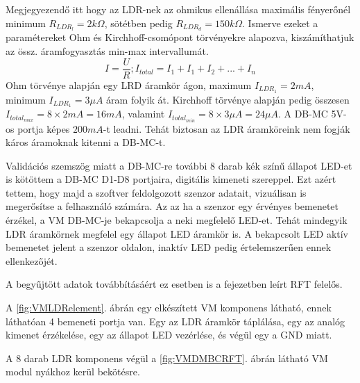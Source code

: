 \documentclass[a4paper,12pt]{article}
\begin{document}
Megjegyezendő itt hogy az LDR-nek az ohmikus ellenállása maximális fényerőnél minimum $R_{LDR_l} = 2 k\Omega$, sötétben pedig $R_{LDR_d} = 150 k\Omega$.
Ismerve ezeket a paramétereket Ohm és Kirchhoff-csomópont törvényekre alapozva, kiszámíthatjuk az össz. áramfogyasztás min-max intervallumát.
\begin{equation}
 I = \frac{U}{R}; I_{total} = I_{1} +I_{1} + I_{2} +... + I_{n}   
\end{equation}
Ohm törvénye alapján egy LRD áramkör ágon, maximum $I_{LDR_1} = 2 mA$, minimum  $I_{LDR_1} = 3 \mu A$ áram folyik át.
Kirchhoff törvénye alapján pedig összesen $I_{total_{max}} = 8 \times 2 mA = 16 mA$, valamint $I_{total_{min}} = 8 \times 3 \mu A= 24\mu A$.
A DB-MC 5V-os portja képes $200 mA$-t leadni. Tehát biztosan az LDR áramköreink nem fogják káros áramoknak kitenni a DB-MC-t.

Validációs szemszög miatt a DB-MC-re további 8 darab kék színű állapot LED-et is kötöttem a DB-MC D1-D8 portjaira, digitális kimeneti szereppel.
Ezt azért tettem, hogy majd a szoftver feldolgozott szenzor adatait, vizuálisan is megerősítse a felhasználó számára.
Az az ha a szenzor egy érvényes bemenetet érzékel, a VM DB-MC-je bekapcsolja a neki megfelelő LED-et. 
Tehát mindegyik LDR áramkörnek megfelel egy állapot LED áramkör is. 
A bekapcsolt LED aktív bemenetet jelent a szenzor oldalon, inaktív LED pedig értelemszerűen ennek ellenkezőjét.

A begyűjtött adatok továbbításáért ez esetben is a \textit{} fejezetben leírt RFT felelős.


A \ref{fig:VMLDRelement}. ábrán egy elkészített VM komponens látható, ennek láthatóan 4 bemeneti portja van.
Egy az LDR áramkör táplálása, egy az analóg kimenet érzékelése, egy az állapot LED vezérlése, és végül egy a GND miatt.

A 8 darab LDR komponens végül a \ref{fig:VMDMBCRFT}. ábrán látható VM modul nyákhoz kerül bekötésre.
\end{document}
